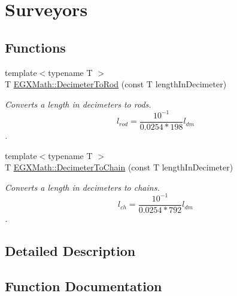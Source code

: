 \hypertarget{group___e_g_x_math-_conversions-_length_conversions-_s_i-_decimeter-_surveyors}{}\section{Surveyors}
\label{group___e_g_x_math-_conversions-_length_conversions-_s_i-_decimeter-_surveyors}
\subsection*{Functions}
\begin{DoxyCompactItemize}
\item 
{\footnotesize template$<$typename T $>$ }\\T \mbox{\hyperlink{group___e_g_x_math-_conversions-_length_conversions-_s_i-_decimeter-_surveyors_gaf34122272f5724db35f8400d284e2ec8}{E\+G\+X\+Math\+::\+Decimeter\+To\+Rod}} (const T length\+In\+Decimeter)
\begin{DoxyCompactList}\small\item\em Converts a length in decimeters to rods. \[ l_{rod}= \frac{10^{-1}}{0.0254 * 198} l_{dm} \]. \end{DoxyCompactList}\item 
{\footnotesize template$<$typename T $>$ }\\T \mbox{\hyperlink{group___e_g_x_math-_conversions-_length_conversions-_s_i-_decimeter-_surveyors_gaae746f9b34bc92e17f9117f5b139fdc4}{E\+G\+X\+Math\+::\+Decimeter\+To\+Chain}} (const T length\+In\+Decimeter)
\begin{DoxyCompactList}\small\item\em Converts a length in decimeters to chains. \[ l_{ch}= \frac{10^{-1}}{0.0254 * 792} l_{dm} \]. \end{DoxyCompactList}\end{DoxyCompactItemize}


\subsection{Detailed Description}


\subsection{Function Documentation}
\mbox{\label{group___e_g_x_math-_conversions-_length_conversions-_s_i-_decimeter-_surveyors_gaae746f9b34bc92e17f9117f5b139fdc4}} 
